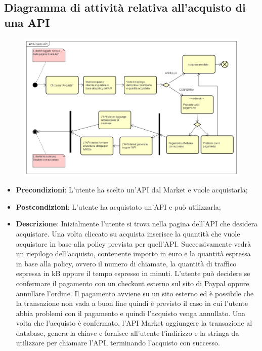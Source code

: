 \newpage
\subsection{Diagramma di attività relativa all'acquisto di una API}
\begin{figure}[h]
	\centering
	\includegraphics[width=1.0\linewidth]{IMG/Acquisto_API}
	\caption{}
	\label{fig:acquistoapi}
\end{figure}

\begin{itemize}
	\item \textbf{Precondizioni}: L'utente ha scelto un'API dal Market e vuole acquistarla;
	\item \textbf{Postcondizioni}: L'utente ha acquistato un'API e può utilizzarla;
	\item \textbf{Descrizione}: Inizialmente l'utente si trova nella pagina dell'API che desidera acquistare. Una volta cliccato su acquista inserisce la quantità che vuole acquistare in base alla policy prevista per quell'API. Successivamente vedrà un riepilogo dell'acquisto, contenente importo in euro e la quantità espressa in base alla policy, ovvero il numero di chiamate, la quantità di traffico espressa in kB oppure il tempo espresso in minuti. L'utente può decidere se confermare il pagamento con un checkout esterno sul sito di Paypal oppure annullare l'ordine. Il pagamento avviene su un sito esterno ed è possibile che la transazione non vada a buon fine quindi è previsto il caso in cui l'utente abbia problemi con il pagamento e quindi l'acquisto venga annullato. Una volta che l'acquisto è confermato, l'API Market aggiungere la transazione al database, genera la chiave e fornisce all'utente l'indirizzo e la stringa da utilizzare per chiamare l'API, terminando l'acquisto con successo. 
\end{itemize}

